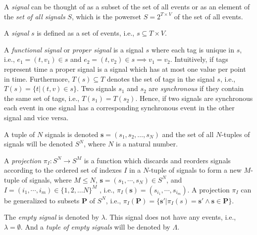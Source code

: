 A \emph{signal} can be thought of as a subset of the set of all events or as
an element of the \emph{set of all signals} $S$, which is the powerset $S = 2^{T \times V}$
of the set of all events.
\begin{sdefinition}
A \emph{signal} $s$ is defined as a set of events, i.e., $s \subseteq T \times V$.
\end{sdefinition}
A \emph{functional signal} or \emph{proper signal} is a signal $s$ where each tag is unique in $s$,
i.e., $e_1 = (t,v_1) \in s$ and $e_2 = (t,v_2) \in s \implies v_1 = v_2$.
Intuitively, if tags represent time a proper signal is a signal which has
at most one value per point in time. Furthermore, $T(s) \subseteq T$ denotes
the set of tags in the signal $s$, i.e., $T(s) = \{t|(t,v) \in s\}$.
Two signals $s_1$ and $s_2$ are \emph{synchronous} if they contain
the same set of tags, i.e., $T(s_1) = T(s_2)$.
Hence, if two signals are synchronous each event in one
signal has a corresponding synchronous event in the other signal and vice versa.

A tuple of $N$ signals is denoted $\mathbf{s} = (s_1, s_2, \dots, s_N)$ and the
set of all $N$-tuples of signals will be denoted $S^N$, where $N$ is a
natural number.
\begin{sdefinition}
A \emph{projection} $\pi{}_I: S^N \to S^M$ is a function which discards and reorders signals according
to the ordered set of indexes $I$ in a $N$-tuple of signals
to form a new $M$-tuple of signals, where $M \le N$, $\mathbf{s} = (s_1,\cdots,s_N) \in S^N$,
and $I = (i_1,\cdots,i_m) \in \{1,2, \ldots N\}^M$
, i.e., $\pi{}_I(\mathbf{s}) = (s_{i_1}, \cdots, s_{i_m})$.
A projection $\pi{}_I$ can be generalized to subsets $\mathbf{P}$ of $S^N$,
i.e., $\pi{}_I(\mathbf{P}) = \{\mathbf{s'}|\pi{}_I(s) = \mathbf{s'} \wedge \mathbf{s} \in \mathbf{P}\}$.
\end{sdefinition}
The \emph{empty signal} is denoted by $\lambda$. This
signal does not have any events, i.e., $\lambda = \emptyset$. And a \emph{tuple
of empty signals} will be denoted by $\Lambda$.

